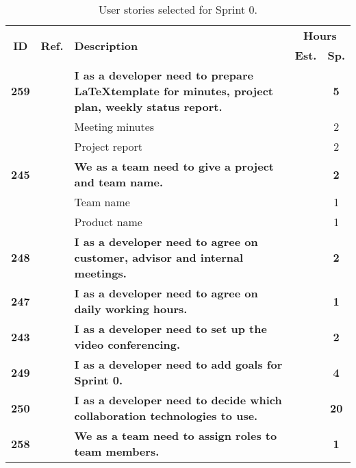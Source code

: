 \begin{table*}[!h]
\caption{User stories selected for Sprint 0. }
\label{tab:sprint0stories}
\def\arraystretch{1.25}
\begin{tabularx}{\textwidth}{ccXcc} 

\toprule[1mm]
\multirow{2}{*}{\textbf{ID}} &
\multirow{2}{*}{\textbf{Ref.}} & \multirow{2}{*}{\textbf{Description}} & \multicolumn{2}{c}{\textbf{Hours}} \\
 					& & & \textbf{Est.} & \textbf{Sp.} \\
\midrule
\textbf{259} 	& 
	& {\bf I as a developer need to prepare \LaTeX template for minutes, project plan, weekly status report.} 	
	& 			
	& \textbf{5} \\
		& & \hspace{2em} Meeting minutes	&  & 2 \\
		& & \hspace{2em} Project report 	&  & 2 \\

\textbf{245} 	& 
	& \textbf{We as a team need to give a project and team name.} 						& 			& \textbf{2} \\
		& & \hspace{2em} Team name &  & 1 \\
		& & \hspace{2em} Product name &  & 1 \\

\textbf{248} 	&
	& \textbf{I as a developer need to agree on customer, advisor and internal meetings.} 						& 			& \textbf{2} \\

\textbf{247} 	&
	& \textbf{I as a developer need to agree on daily working hours.} 						&  			& \textbf{1} \\

\textbf{243} 	&
	& \textbf{I as a developer need to set up the video conferencing.} 						& 			& \textbf{2} \\

\textbf{249} 	&
	& \textbf{I as a developer need to add goals for Sprint 0.} 						& 			& \textbf{4} \\

\textbf{250} 	&
	& \textbf{I as a developer need to decide which collaboration technologies to use.} 						& 			& \textbf{20} \\

\textbf{258} 	&
	& \textbf{We as a team need to assign roles to team members.} 						& 			& \textbf{1} \\


\end{tabularx}
\end{table*}
